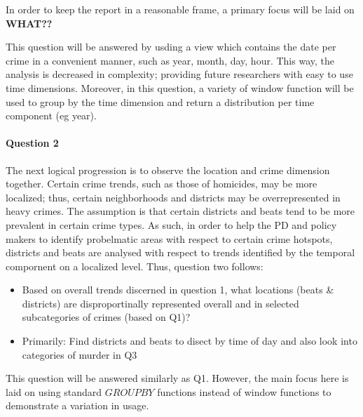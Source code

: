 \documentclass[a4paper]{article}
\begin{document}
In order to keep the report in a reasonable frame, a primary focus will be laid on \textbf{WHAT??}

This question will be answered by usding a view which contains the date per crime in a convenient manner, such as year, month, day, hour. This way, the analysis is decreased in complexity; providing future researchers with easy to use time dimensions. Moreover, in this question, a variety of window function will be used to group by the time dimension and return a distribution per time component (eg year).

\paragraph{Question 2} The next logical progression is to observe the location and crime dimension together. Certain crime trends, such as those of homicides, may be more localized; thus, certain neighborhoods and districts may be overrepresented in heavy crimes. The assumption is that certain districts and beats tend to be more prevalent in certain crime types. As such, in order to help the PD and policy makers to identify probelmatic areas with respect to certain crime hotspots, districts and beats are analysed with respect to trends identified by the temporal compornent on a localized level. Thus, question two follows:

\begin{itemize}
  \item Based on overall trends discerned in question 1, what locations (beats \& districts) are disproportinally represented overall and in selected subcategories of crimes (based on Q1)?
  \item Primarily: Find districts and beats to disect by time of day and also look into categories of murder in Q3
\end{itemize}

This question will be answered similarly as Q1. However, the main focus here is laid on using standard $GROUP BY$ functions instead of window functions to demonstrate a variation in usage. 
\end{document}
